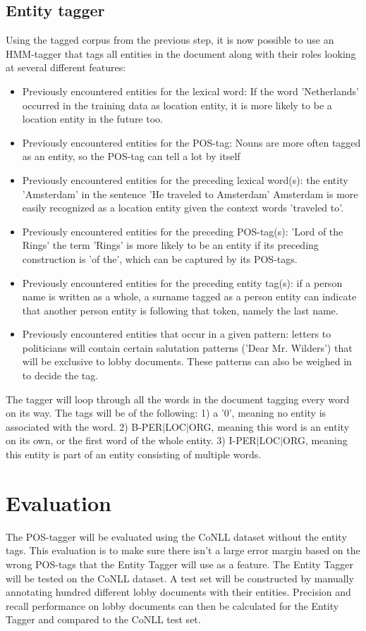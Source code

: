 \documentclass{article}
\begin{document}
\subsection{Entity tagger}
Using the tagged corpus from the previous step, it is now possible to use an HMM-tagger that tags all entities in the document along with their roles looking at several different features:\\
\begin{itemize}
\item Previously encountered entities for the lexical word: If the word 'Netherlands' occurred in the training data as location entity, it is more likely to be a location entity in the future too.
\item Previously encountered entities for the POS-tag: Nouns are more often tagged as an entity, so the POS-tag can tell a lot by itself
\item Previously encountered entities for the preceding  lexical word(s): the entity 'Amsterdam' in the sentence 'He traveled to Amsterdam' Amsterdam is more easily recognized as a location entity given the context words 'traveled to'.
\item Previously encountered entities for the preceding POS-tag(s): 'Lord of the Rings' the term 'Rings' is more likely to be an entity if its preceding construction is 'of the', which can be captured by its POS-tags.
\item Previously encountered entities for the preceding entity tag(s): if a person name is written as a whole, a surname tagged as a person entity can indicate that another person entity is following that token, namely the last name.  
\item Previously encountered entities that occur in a given pattern: letters to politicians will contain certain salutation patterns ('Dear Mr. Wilders') that will be exclusive to lobby documents. These patterns can also be weighed in to decide the tag.
\end{itemize}

The tagger will loop through all the words in the document tagging every word on its way. The tags will be of the following: 1) a '0', meaning no entity is associated with the word. 2) B-PER$\mid$LOC$\mid$ORG, meaning this word is an entity on its own, or the first word of the whole entity. 3) I-PER$\mid$LOC$\mid$ORG, meaning this entity is part of an entity consisting of multiple words.

\section{Evaluation}
The POS-tagger will be evaluated using the CoNLL dataset without the entity tags. This evaluation is to make sure there isn't a large error margin based on the wrong POS-tags that the Entity Tagger will use as a feature. The Entity Tagger will be tested on the CoNLL dataset. A test set will be constructed by manually annotating hundred different lobby documents with their entities. Precision and recall performance on lobby documents can then be calculated for the Entity Tagger and compared to the CoNLL test set.
\end{document}
